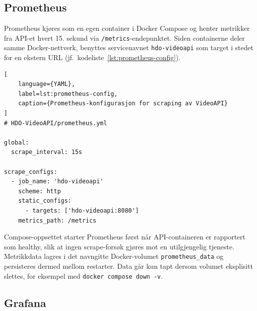 \subsection{Prometheus}
\label{subsec:obs-prom}


Prometheus kjøres som en egen container i Docker Compose og henter metrikker fra API-et hvert 15. sekund via \texttt{/metrics}-endepunktet. Siden containerne deler samme Docker-nettverk, benyttes servicenavnet \texttt{hdo-videoapi} som target i stedet for en ekstern URL (jf.\ kodeliste~\ref{lst:prometheus-config}).

\begin{lstlisting}[
    language={YAML},
    label=lst:prometheus-config,
    caption={Prometheus-konfigurasjon for scraping av VideoAPI}
]
# HDO-VideoAPI/prometheus.yml

global:
  scrape_interval: 15s

scrape_configs:
  - job_name: 'hdo-videoapi'
    scheme: http
    static_configs:
      - targets: ['hdo-videoapi:8080']
    metrics_path: /metrics
\end{lstlisting}


Compose-oppsettet starter Prometheus først når API-containeren er rapportert som healthy, slik at ingen scrape-forsøk gjøres mot en utilgjengelig tjeneste. Metrikkdata lagres i det navngitte Docker-volumet \texttt{prometheus\_data} og persisteres dermed mellom restarter. Data går kun tapt dersom volumet eksplisitt slettes, for eksempel med \texttt{docker compose down -v}.

\subsection{Grafana}
\label{subsec:obs-graf}


